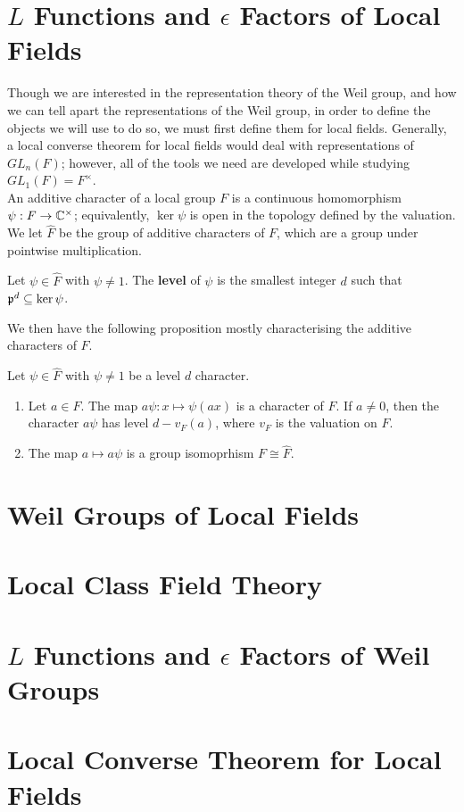 \section{$L$ Functions and $\epsilon$ Factors of Local Fields}
Though we are interested in the representation theory of the Weil group, and how we can tell apart the representations of the Weil group, in order to define the objects we will use to do so, we must first define them for local fields.
Generally, a local converse theorem for local fields would deal with representations of $GL_n(F)$; however, all of the tools we need are developed while studying $GL_1(F) = F^\times$.\\

An additive character of a local group $F$ is a continuous homomorphism $\psi: F \to \mathbb{C}^\times$; equivalently, $\ker \psi$ is open in the topology defined by the valuation.
We let $\hat{F}$ be the group of additive characters of $F$, which are a group under pointwise multiplication.
\begin{defn}
  Let $\psi \in \hat{F}$ with $\psi \neq 1$. The \textbf{level} of $\psi$ is the smallest integer $d$ such that $\mathfrak{p}^d \subseteq \ker \psi$.
\end{defn}
We then have the following proposition mostly characterising the additive characters of $F$.
\begin{prop}
  Let $\psi \in \hat{F}$ with $\psi \neq 1$ be a level $d$ character.
  \begin{enumerate}
    \item Let $a \in F$. The map $a \psi : x \mapsto \psi(ax)$ is a character of $F$. If $a \neq 0$, then the character $a \psi$ has level $d - v_F(a)$, where $v_F$ is the valuation on $F$.
    \item The map $a \mapsto a \psi$ is a group isomoprhism $F \cong \hat{F}$.
  \end{enumerate}
\end{prop}
\section{Weil Groups of Local Fields}

\section{Local Class Field Theory}

\section{$L$ Functions and $\epsilon$ Factors of Weil Groups}

\section{Local Converse Theorem for Local Fields}

\endinput

